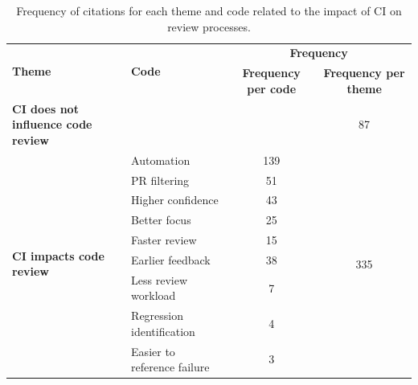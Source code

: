 	\begin{table}
		\centering
		\caption{Frequency of citations for each theme and code related to the impact of CI on review processes.}
		\begin{tabular}{p{11.0em}p{12.5em}cc}
			\hline
			\multirow{2}[4]{*}{\textbf{Theme}} & \multirow{2}[4]{*}{\textbf{Code}} & \multicolumn{2}{p{11.25em}}{\textbf{Frequency}} \bigstrut\\
			\cline{3-4}    \multicolumn{1}{c}{} & \multicolumn{1}{c}{} & \multicolumn{1}{p{5.915em}}{\textbf{Frequency per code}} & \multicolumn{1}{p{5.335em}}{\textbf{Frequency per theme}} \bigstrut\\
			\hline
			\multirow{2}[2]{*}{\parbox{3cm}{\centering \textbf{CI does not influence code review}}} & \multirow{2}[2]{*}{} & \multirow{2}[2]{*}{} & \multirow{2}[2]{*}{87} \bigstrut[t]\\
			\multicolumn{1}{c}{} & \multicolumn{1}{c}{} &       &  \bigstrut[b]\\
			\hline
			\multirow{11}[22]{*}{\parbox{3cm}{\centering \textbf{CI impacts code review}}} & Automation & 139   & \multirow{11}[22]{*}{335} \bigstrut\\
			\cline{2-3}    \multicolumn{1}{c}{} & PR filtering & 51    &  \bigstrut\\
			\cline{2-3}    \multicolumn{1}{c}{} & Higher confidence & 43    &  \bigstrut\\
			\cline{2-3}    \multicolumn{1}{c}{} & Better focus & 25    &  \bigstrut\\
			\cline{2-3}    \multicolumn{1}{c}{} & Faster review & 15    &  \bigstrut\\
			\cline{2-3}    \multicolumn{1}{c}{} & Earlier feedback & 38    &  \bigstrut\\
			\cline{2-3}    \multicolumn{1}{c}{} & Less review workload & 7     &  \bigstrut\\
			\cline{2-3}    \multicolumn{1}{c}{} & Regression identification & 4     &  \bigstrut\\
			\cline{2-3}    \multicolumn{1}{c}{} & Easier to reference failure & 3     &  \bigstrut\\

\end{tabular}
\end{table}
